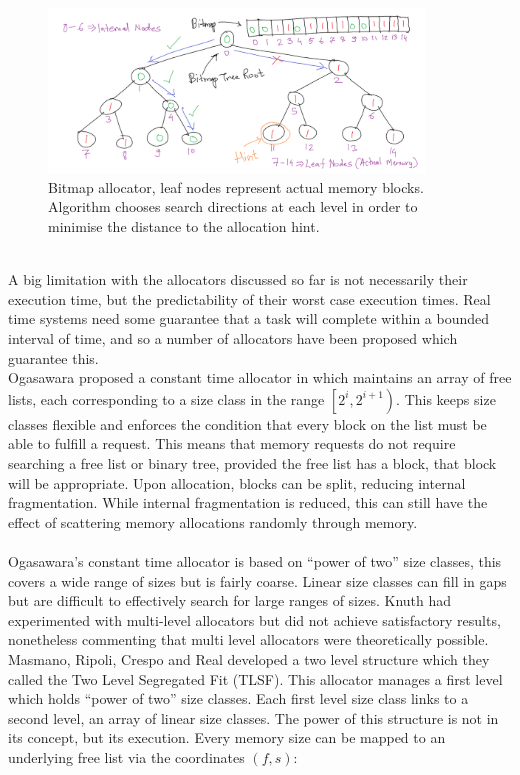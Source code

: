 \documentclass{article}
\begin{document}
\\
\begin{figure}[htbp]
	\centering
	\includegraphics[width=10cm]{bitmap_allocator}
	\captionsetup{width=10cm}
	\caption{Bitmap allocator, leaf nodes represent actual memory blocks. Algorithm chooses search directions at each level in order to minimise the distance to the allocation hint.}
\end{figure}
\\
A big limitation with the allocators discussed so far is not necessarily their execution time, but the predictability of their worst case execution times. Real time systems need some guarantee that a task will complete within a bounded interval of time, and so a number of allocators have been proposed which guarantee this.\\
Ogasawara proposed a constant time allocator in \cite{528746} which maintains an array of free lists, each corresponding to a size class in the range $\left[2^i, 2^{i + 1}\right)$. This keeps size classes flexible and enforces the condition that every block on the list must be able to fulfill a request. This means that memory requests do not require searching a free list or binary tree, provided the free list has a block, that block will be appropriate. Upon allocation, blocks can be split, reducing internal fragmentation. While internal fragmentation is reduced, this can still have the effect of scattering memory allocations randomly through memory.\\
\\
Ogasawara's constant time allocator is based on ``power of two'' size classes, this covers a wide range of sizes but is fairly coarse. Linear size classes can fill in gaps but are difficult to effectively search for large ranges of sizes. Knuth had experimented with multi-level allocators but did not achieve satisfactory results, nonetheless commenting that multi level allocators were theoretically possible.\\
Masmano, Ripoli, Crespo and Real \cite{inproceedings} developed a two level structure which they called the Two Level Segregated Fit (TLSF). This allocator manages a first level which holds ``power of two'' size classes. Each first level size class links to a second level, an array of linear size classes. The power of this structure is not in its concept, but its execution. Every memory size can be mapped to an underlying free list via the coordinates $\left(f,s\right)$:\\
\end{document}
